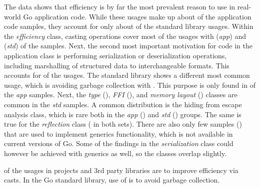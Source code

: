 The data shows that efficiency is by far the most prevalent reason to use \unsafe{} in real-world Go application code.
While these usages make up about  of the application code samples, they account for only about
 of the standard library usages.
Within the \textit{efficiency} class, casting operations cover most of the usages with  (\textit{app})
and  (\textit{std}) of the samples.
Next, the second most important motivation for \unsafe{} code in the application class is performing serialization or
deserialization operations, including marshalling of structured data to interchangeable formats.
This accounts for  of the usages.
The standard library shows a different most common usage, which is avoiding garbage collection with .
This purpose is only found in  of the \textit{app} samples.
Next, the \textit{type} (), \textit{\acrshort{FFI}} (), and \textit{memory layout}
() classes are common in the \textit{std} samples.
A common distribution is the hiding from escape analysis class, which is rare both in the \textit{app}
() and \textit{std} () groups.
The same is true for the \textit{reflection} class ( in both sets).
There are also only few samples () that are used to implement generics functionality, which is not
available in current versions of Go.
Some of the findings in the \textit{serialization} class could however be achieved with generics as well, so the classes
overlap slightly.

\begin{answerToRQ}[\ref{rq:purpose}]
     of the \unsafe{} usages in projects and 3rd party libraries are to improve efficiency via
    \unsafe{} casts.
    In the Go standard library,  use of \unsafe{} is to avoid garbage collection.
\end{answerToRQ}

